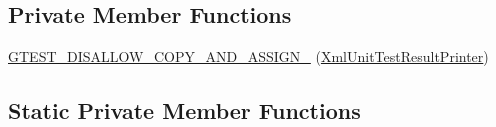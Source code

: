 \subsection*{Private Member Functions}
\begin{DoxyCompactItemize}
\item 
\hyperlink{classtesting_1_1internal_1_1XmlUnitTestResultPrinter_a2384a8c0cae7cbdf3debac145e43b323}{G\+T\+E\+S\+T\+\_\+\+D\+I\+S\+A\+L\+L\+O\+W\+\_\+\+C\+O\+P\+Y\+\_\+\+A\+N\+D\+\_\+\+A\+S\+S\+I\+G\+N\+\_\+} (\hyperlink{classtesting_1_1internal_1_1XmlUnitTestResultPrinter}{Xml\+Unit\+Test\+Result\+Printer})
\end{DoxyCompactItemize}
\subsection*{Static Private Member Functions}

